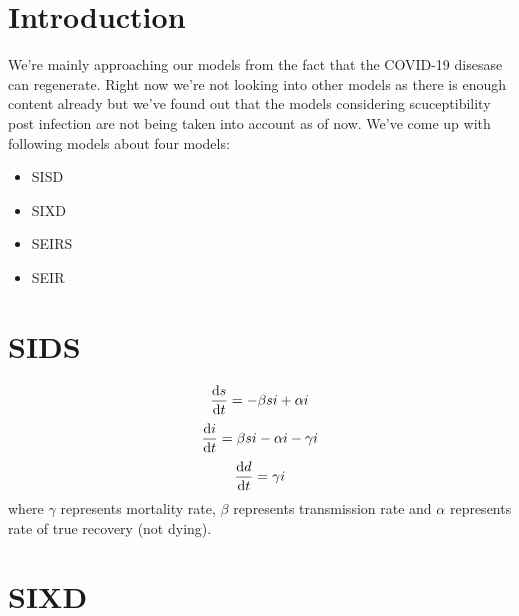 \documentclass{article}
\begin{document}
	\section{Introduction}
	We're mainly approaching our models from the fact that the COVID-19 disesase can regenerate. Right now we're not looking into other models as there is enough content already but we've found out that the models considering scuceptibility post infection are not being taken into account as of now. We've come up with following models about four models:
	\begin{itemize}
		\item SISD
		\item SIXD
		\item SEIRS
		\item SEIR
	\end{itemize}
	\section{SIDS}
	\begin{equation*}
		\dv{s}{t} = -\beta si + \alpha i
	\end{equation*}
	\begin{equation*}
		\dv{i}{t} = \beta si - \alpha i - \gamma i
	\end{equation*}
	\begin{equation*}
		\dv{d}{t} = \gamma i
	\end{equation*}
	where $\gamma$ represents mortality rate, $\beta$ represents transmission rate and $\alpha$ represents rate of true recovery (not dying).


	\section{SIXD}
\end{document}
